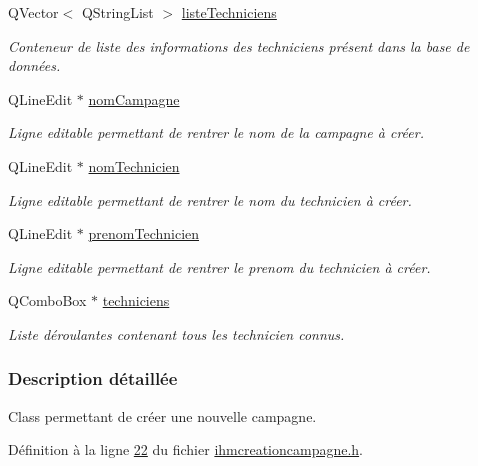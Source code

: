 \begin{DoxyCompactItemize}
Q\+Vector$<$ Q\+String\+List $>$ \hyperlink{class_i_h_m_creation_campagne_aee78d20f0263359283cbcbc50fac3143}{liste\+Techniciens}
\begin{DoxyCompactList}\small\item\em Conteneur de liste des informations des techniciens présent dans la base de données. \end{DoxyCompactList}\item 
Q\+Line\+Edit $\ast$ \hyperlink{class_i_h_m_creation_campagne_a6f07f2571a10f035c7b6a3ef1daefdab}{nom\+Campagne}
\begin{DoxyCompactList}\small\item\em Ligne editable permettant de rentrer le nom de la campagne à créer. \end{DoxyCompactList}\item 
Q\+Line\+Edit $\ast$ \hyperlink{class_i_h_m_creation_campagne_a5546fee9a51daceb1b719b105427dfe9}{nom\+Technicien}
\begin{DoxyCompactList}\small\item\em Ligne editable permettant de rentrer le nom du technicien à créer. \end{DoxyCompactList}\item 
Q\+Line\+Edit $\ast$ \hyperlink{class_i_h_m_creation_campagne_a95e0a4f224110a79731e947baa505b7e}{prenom\+Technicien}
\begin{DoxyCompactList}\small\item\em Ligne editable permettant de rentrer le prenom du technicien à créer. \end{DoxyCompactList}\item 
Q\+Combo\+Box $\ast$ \hyperlink{class_i_h_m_creation_campagne_a8235e7a18cda1298be624a59a4cc1a56}{techniciens}
\begin{DoxyCompactList}\small\item\em Liste déroulantes contenant tous les technicien connus. \end{DoxyCompactList}\end{DoxyCompactItemize}


\subsubsection{Description détaillée}
Class permettant de créer une nouvelle campagne. 

Définition à la ligne \hyperlink{ihmcreationcampagne_8h_source_l00022}{22} du fichier \hyperlink{ihmcreationcampagne_8h_source}{ihmcreationcampagne.\+h}.



